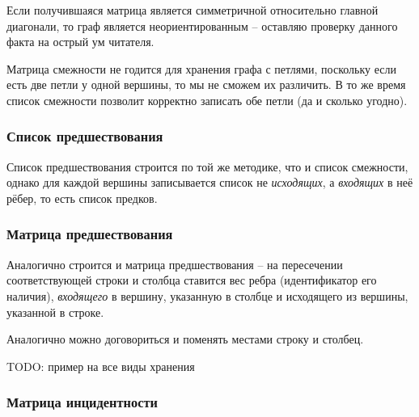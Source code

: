 \begin{remark}
	Если получившаяся матрица является симметричной относительно главной диагонали, то граф является неориентированным -- оставляю проверку данного факта на острый ум читателя.
\end{remark}

\begin{remark}
	Матрица смежности не годится для хранения графа с петлями, поскольку если есть две петли у одной вершины, то мы не сможем их различить. В то же время список смежности позволит корректно записать обе петли (да и сколько угодно).
\end{remark}

\subsubsection{Список предшествования}

Список предшествования строится по той же методике, что и список смежности, однако для каждой вершины записывается список не \textit{исходящих}, а \textit{входящих} в неё рёбер, то есть список предков.

\subsubsection{Матрица предшествования}

Аналогично строится и матрица предшествования -- на пересечении соответствующей строки и столбца ставится вес ребра (идентификатор его наличия), \textit{входящего} в вершину, указанную в столбце и исходящего из вершины, указанной в строке.

Аналогично можно договориться и поменять местами строку и столбец.

TODO: пример на все виды хранения

\subsubsection{Матрица инцидентности}
